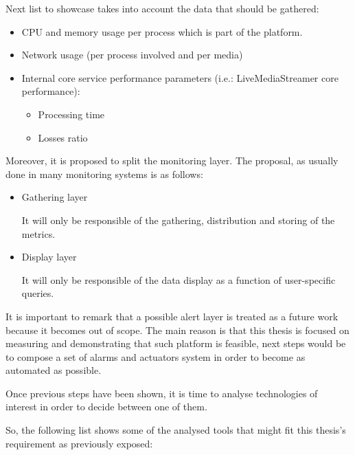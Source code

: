 Next list to showcase takes into account the data that should be gathered:

\begin{itemize}
\item CPU and memory usage per process which is part of the platform.
\item Network usage (per process involved and per media)
\item Internal core service performance parameters (i.e.: LiveMediaStreamer core performance):
\begin{itemize}
\item Processing time
\item Losses ratio
\end{itemize}
\end{itemize}

Moreover, it is proposed to split the monitoring layer. The proposal, as usually done in many monitoring systems is as follows:
\begin{itemize}
\item Gathering layer \hfill

It will only be responsible of the gathering, distribution and storing of the metrics.

\item Display layer

It will only be responsible of the data display as a function of user-specific queries.

\end{itemize}
It is important to remark that a possible alert layer is treated as a future work because it becomes out of scope. The main reason is that this thesis is focused on measuring and demonstrating that such platform is feasible, next steps would be to compose a set of alarms and actuators system in order to become as automated as possible.

Once previous steps have been shown, it is time to analyse technologies of interest in order to decide between one of them.

So, the following list shows some of the analysed tools that might fit this thesis's requirement as previously exposed:

